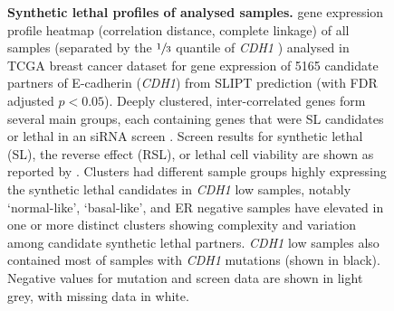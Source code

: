 \begin{figure}[!htbp]
  \centering
    \caption[Synthetic lethal  profiles of analysed samples]{\small \textbf{Synthetic lethal  profiles of analysed samples.} \Gls{gene expression} profile heatmap (correlation distance, complete linkage) of all samples (separated by the $\sfrac{1}{3}$ quantile of \textit{CDH1} ) analysed in \gls{TCGA} breast cancer dataset for \gls{gene expression} of 5165 candidate partners of \gls{E-cadherin} (\textit{CDH1}) from \gls{SLIPT} prediction (with \gls{FDR} adjusted $p < 0.05$). Deeply clustered, inter-correlated genes form several main groups, each containing genes that were SL candidates or lethal in an \gls{siRNA} screen \citep{Telford2015}. Screen results for \gls{synthetic lethal} (SL), the reverse effect (RSL), or lethal cell viability are shown as reported by \citet{Telford2015}. Clusters had different sample groups highly expressing the \gls{synthetic lethal} candidates in \textit{CDH1} low samples, notably `normal-like', `basal-like', and \gls{ER} negative samples have elevated  in one or more distinct clusters showing complexity and variation among candidate \gls{synthetic lethal} partners. \textit{CDH1} low samples also contained most of samples with \textit{CDH1} \glspl{mutation} (shown in black). Negative values for \gls{mutation} and screen data are shown in light grey, with missing data in white.
}
\label{fig:slipt_expr}
\end{figure}

